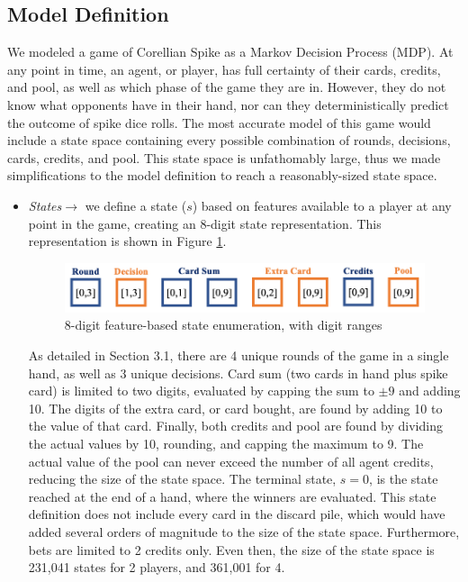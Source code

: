 \documentclass{article}
\begin{document}
\subsection{Model Definition} %
We modeled a game of Corellian Spike as a Markov Decision Process (MDP). At any point in time, an agent, or player, has full certainty of their cards, credits, and pool, as well as which phase of the game they are in. However, they do not know what opponents have in their hand, nor can they deterministically predict the outcome of spike dice rolls. The most accurate model of this game would include a state space containing every possible combination of rounds, decisions, cards, credits, and pool. This state space is unfathomably large, thus we made simplifications to the model definition to reach a reasonably-sized state space.
\begin{itemize}
    \item \textit{States}$\rightarrow$ we define a state ($s$) based on features available to a player at any point in the game, creating an 8-digit state representation. This representation is shown in Figure \ref{fig:state_digits}.
    \begin{figure}[H]
    \centering
        \includegraphics[width=.6\textwidth]{report/figures/state.png}
        \caption{8-digit feature-based state enumeration, with digit ranges}
        \label{fig:state_digits}
    \end{figure}
    As detailed in Section 3.1, there are 4 unique rounds of the game in a single hand, as well as 3 unique decisions. Card sum (two cards in hand plus spike card) is limited to two digits, evaluated by capping the sum to $\pm 9$ and adding 10. The digits of the extra card, or card bought, are found by adding 10 to the value of that card. Finally, both credits and pool are found by dividing the actual values by 10, rounding, and capping the maximum to 9. The actual value of the pool can never exceed the number of all agent credits, reducing the size of the state space. The terminal state, $s=0$, is the state reached at the end of a hand, where the winners are evaluated. This state definition does not include every card in the discard pile, which would have added several orders of magnitude to the size of the state space. Furthermore, bets are limited to 2 credits only. Even then, the size of the state space is 231,041 states for 2 players, and 361,001 for 4.  

\end{itemize}
\end{document}
